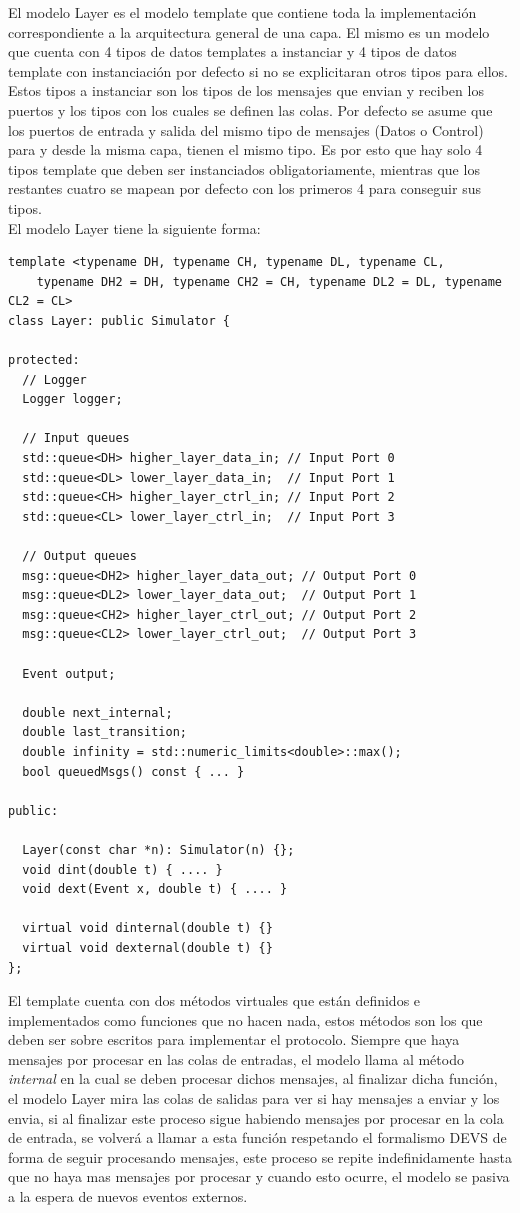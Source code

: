 \documentclass[10pt,a4paper]{article}
\begin{document}
El modelo Layer es el modelo template que contiene toda la implementación correspondiente a la arquitectura general de una capa. El mismo es un modelo que cuenta con 4 tipos de datos templates a instanciar y 4 tipos de datos template con instanciación por defecto si no se explicitaran otros tipos para ellos. Estos tipos a instanciar son los tipos de los mensajes que envian y reciben los puertos y los tipos con los cuales se definen las colas. Por defecto se asume que los puertos de entrada y salida del mismo tipo de mensajes (Datos o Control) para y desde la misma capa, tienen el mismo tipo. Es por esto que hay solo 4 tipos template que deben ser instanciados obligatoriamente, mientras que los restantes cuatro se mapean por defecto con los primeros 4 para conseguir sus tipos.\\

El modelo Layer tiene la siguiente forma:
\begin{lstlisting}
template <typename DH, typename CH, typename DL, typename CL, 
	typename DH2 = DH, typename CH2 = CH, typename DL2 = DL, typename CL2 = CL>
class Layer: public Simulator { 

protected:
  // Logger
  Logger logger;

  // Input queues
  std::queue<DH> higher_layer_data_in; // Input Port 0
  std::queue<DL> lower_layer_data_in;  // Input Port 1
  std::queue<CH> higher_layer_ctrl_in; // Input Port 2 
  std::queue<CL> lower_layer_ctrl_in;  // Input Port 3
  
  // Output queues
  msg::queue<DH2> higher_layer_data_out; // Output Port 0 
  msg::queue<DL2> lower_layer_data_out;  // Output Port 1
  msg::queue<CH2> higher_layer_ctrl_out; // Output Port 2
  msg::queue<CL2> lower_layer_ctrl_out;  // Output Port 3

  Event output;

  double next_internal;
  double last_transition;
  double infinity = std::numeric_limits<double>::max();
  bool queuedMsgs() const { ... }

public:

  Layer(const char *n): Simulator(n) {};
  void dint(double t) { .... }
  void dext(Event x, double t) { .... }
  
  virtual void dinternal(double t) {}
  virtual void dexternal(double t) {}
};
\end{lstlisting}

El template cuenta con dos métodos virtuales que están definidos e implementados como funciones que no hacen nada, estos métodos son los que deben ser sobre escritos para implementar el protocolo. Siempre que haya mensajes por procesar en las colas de entradas, el modelo llama al método \textit{internal} en la cual se deben procesar dichos mensajes, al finalizar dicha función, el modelo Layer mira las colas de salidas para ver si hay mensajes a enviar y los envia, si al finalizar este proceso sigue habiendo mensajes por procesar en la cola de entrada, se volverá a llamar a esta función respetando el formalismo DEVS de forma de seguir procesando mensajes, este proceso se repite indefinidamente hasta que no haya mas mensajes por procesar y cuando esto ocurre, el modelo se pasiva a la espera de nuevos eventos externos. \\
\end{document}
